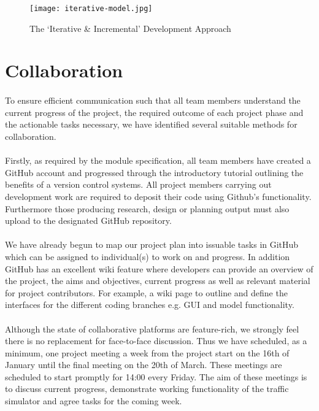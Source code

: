 \documentclass[11pt,a4paper]{article}
\begin{document}
\begin{figure}[hbtp]
\centering
\texttt{[image: iterative-model.jpg]}
\caption{The ‘Iterative \& Incremental' Development Approach}
\end{figure}
\clearpage
\pagebreak

\section{Collaboration}
\paragraph{}
To ensure efficient communication such that all team members understand the current progress of the project, the required outcome of each project phase and the actionable tasks necessary, we have identified several suitable methods for collaboration.
\paragraph{}
Firstly, as required by the module specification, all team members have created a GitHub account and progressed through the introductory tutorial outlining the benefits of a version control systems.  All project members carrying out development work are required to deposit their code using Github’s functionality.  Furthermore those producing research, design or planning output must also upload to the designated GitHub repository.
\paragraph{}
We have already begun to map our project plan into issuable tasks in GitHub which can be assigned to individual(s) to work on and progress.  In addition GitHub has an excellent wiki feature where developers can provide an overview of the project, the aims and objectives, current progress as well as relevant material for project contributors.  For example, a wiki page to outline and define the interfaces for the different coding branches e.g. GUI and model functionality.
\paragraph{}
Although the state of collaborative platforms are feature-rich, we strongly feel there is no replacement for face-to-face discussion.  Thus we have scheduled, as a minimum, one project meeting a week from the project start on the 16th of January until the final meeting on the 20th of March.  These meetings are scheduled to start promptly for 14:00 every Friday.  The aim of these meetings is to discuss current progress, demonstrate working functionality of the traffic simulator and agree tasks for the coming week.
\end{document}
